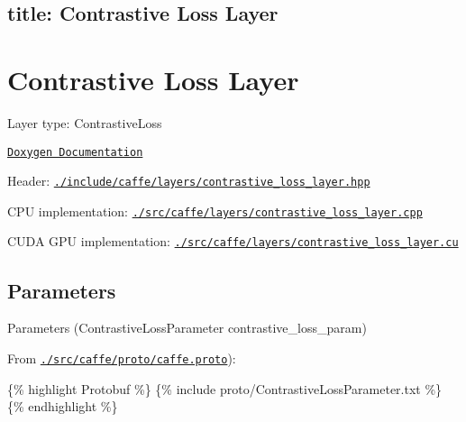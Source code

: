 

 \subsection*{title\+: Contrastive Loss Layer }

\section*{Contrastive Loss Layer}


\begin{DoxyItemize}
\item Layer type\+: {\ttfamily Contrastive\+Loss}
\item \href{http://caffe.berkeleyvision.org/doxygen/classcaffe_1_1ContrastiveLossLayer.html}{\tt Doxygen Documentation}
\item Header\+: \href{https://github.com/BVLC/caffe/blob/master/include/caffe/layers/contrastive_loss_layer.hpp}{\tt {\ttfamily ./include/caffe/layers/contrastive\+\_\+loss\+\_\+layer.hpp}}
\item C\+PU implementation\+: \href{https://github.com/BVLC/caffe/blob/master/src/caffe/layers/contrastive_loss_layer.cpp}{\tt {\ttfamily ./src/caffe/layers/contrastive\+\_\+loss\+\_\+layer.cpp}}
\item C\+U\+DA G\+PU implementation\+: \href{https://github.com/BVLC/caffe/blob/master/src/caffe/layers/contrastive_loss_layer.cu}{\tt {\ttfamily ./src/caffe/layers/contrastive\+\_\+loss\+\_\+layer.cu}}
\end{DoxyItemize}

\subsection*{Parameters}


\begin{DoxyItemize}
\item Parameters ({\ttfamily Contrastive\+Loss\+Parameter contrastive\+\_\+loss\+\_\+param})
\item From \href{https://github.com/BVLC/caffe/blob/master/src/caffe/proto/caffe.proto}{\tt {\ttfamily ./src/caffe/proto/caffe.proto}})\+:
\end{DoxyItemize}

\{\% highlight Protobuf \%\} \{\% include proto/\+Contrastive\+Loss\+Parameter.\+txt \%\} \{\% endhighlight \%\} 